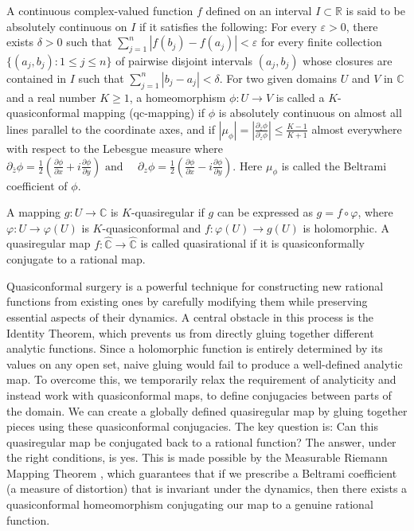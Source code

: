\documentclass[12pt]{article}
\begin{document}
A continuous complex-valued function \( f \) defined on an interval \( I \subset \mathbb{R} \) is said to be absolutely continuous on \( I \) if it satisfies the following: For every \( \varepsilon > 0 \), there exists \( \delta > 0 \) such that $\sum_{j=1}^{n} \left| f(b_j) - f(a_j) \right| < \varepsilon$ for every finite collection $\{(a_j, b_j): 1 \leq j \leq n\}$ of pairwise disjoint intervals \( (a_j, b_j) \) whose closures are contained in \( I \) such that $\sum_{j=1}^{n} |b_j - a_j| < \delta$. For  two given domains $U$ and $V$ in $\mathbb{C}$ and a real number $K\geq1$, a homeomorphism $\phi: U\rightarrow V$ is called a $K$-quasiconformal mapping (qc-mapping) if $\phi $ is absolutely continuous on almost all lines parallel to the coordinate axes, and if $|\mu_\phi|=|\frac{\partial_{\bar{z}} \phi}{\partial_{z} \phi}|\leq \frac{K-1}{K+1}$ almost everywhere with respect to the Lebesgue measure where 
$\partial_{\bar{z}} \phi = \frac{1}{2} \left( \frac{\partial \phi}{\partial x} + i \frac{\partial \phi}{\partial y} \right)  \mbox{~and~}\quad
\partial_{z} \phi = \frac{1}{2} \left( \frac{\partial \phi}{\partial x} - i \frac{\partial \phi}{\partial y} \right)$. Here $\mu_\phi$ is called the Beltrami coefficient of $\phi$. 
\par A mapping \( g : U \to \mathbb{C} \) is \( K \)-quasiregular if  \( g \) can be expressed as $g = f \circ \varphi$, where \( \varphi : U \to \varphi(U) \) is \( K \)-quasiconformal and \( f : \varphi(U) \to g(U) \) is holomorphic. A quasiregular map \( f: \widehat{\mathbb{C}} \to \widehat{\mathbb{C}} \) is called quasirational if it is quasiconformally conjugate to a rational map.





Quasiconformal surgery is a powerful technique for constructing new rational functions from existing ones by carefully modifying them while preserving essential aspects of their dynamics. A central obstacle in this process is the Identity Theorem, which prevents us from directly gluing together different analytic functions. Since a holomorphic function is entirely determined by its values on any open set, naive gluing would fail to produce a well-defined analytic map. To overcome this, we temporarily relax the requirement of analyticity and instead work with quasiconformal maps, to define conjugacies between parts of the domain. We can create a globally defined quasiregular map by gluing together pieces using these quasiconformal conjugacies. The key question is: Can this quasiregular map be conjugated back to a rational function? The answer, under the right conditions, is yes. This is made possible by the Measurable Riemann Mapping Theorem \cite{ahlfors2006lectures}, which guarantees that if we prescribe a Beltrami coefficient (a measure of distortion) that is invariant under the dynamics, then there exists a quasiconformal homeomorphism conjugating our map to a genuine rational function. 
\end{document}
